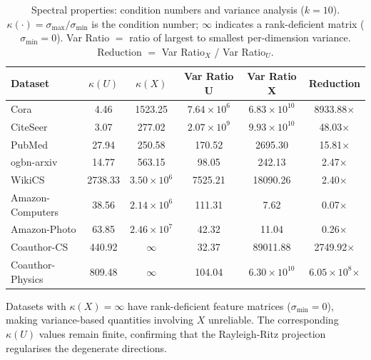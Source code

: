 \begin{table}[t]
\centering
\caption{Spectral properties: condition numbers and variance analysis ($k=10$). $\kappa(\cdot)=\sigma_{\max}/\sigma_{\min}$ is the condition number; $\infty$ indicates a rank-deficient matrix ($\sigma_{\min}=0$). Var Ratio $=$ ratio of largest to smallest per-dimension variance. Reduction $=$ Var Ratio$_X$ / Var Ratio$_U$.}
\label{tab:spectral_properties}
\begin{tabular}{lccccc}
\toprule
\textbf{Dataset} & $\kappa(U)$ & $\kappa(X)$ & \textbf{Var Ratio U} & \textbf{Var Ratio X} & \textbf{Reduction} \\
\midrule
Cora                 & 4.46 & 1523.25 & $7.64\times10^{6}$ & $6.83\times10^{10}$ & 8933.88$\times$ \\
CiteSeer             & 3.07 & 277.02 & $2.07\times10^{9}$ & $9.93\times10^{10}$ & 48.03$\times$ \\
PubMed               & 27.94 & 250.58 & 170.52 & 2695.30 & 15.81$\times$ \\
ogbn-arxiv           & 14.77 & 563.15 & 98.05 & 242.13 & 2.47$\times$ \\
WikiCS               & 2738.33 & $3.50\times10^{6}$ & 7525.21 & 18090.26 & 2.40$\times$ \\
Amazon-Computers     & 38.56 & $2.14\times10^{6}$ & 111.31 & 7.62 & 0.07$\times$ \\
Amazon-Photo         & 63.85 & $2.46\times10^{7}$ & 42.32 & 11.04 & 0.26$\times$ \\
Coauthor-CS          & 440.92 & $\infty$ & 32.37 & 89011.88 & 2749.92$\times$\rlap{$^\dagger$} \\
Coauthor-Physics     & 809.48 & $\infty$ & 104.04 & $6.30\times10^{10}$ & $6.05\times10^{8}$$\times$\rlap{$^\dagger$} \\
\bottomrule
\end{tabular}
\begin{tablenotes}\small
\item[$\dagger$] Datasets with $\kappa(X)=\infty$ have rank-deficient feature matrices ($\sigma_{\min}=0$), making variance-based quantities involving $X$ unreliable. The corresponding $\kappa(U)$ values remain finite, confirming that the Rayleigh-Ritz projection regularises the degenerate directions.
\end{tablenotes}
\end{table}
